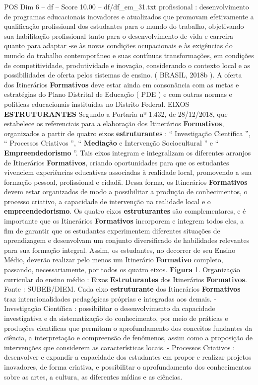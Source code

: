 \begin{textsample}{POS Dim 6 – df – Score 10.00 – df/df\_em\_31.txt}
profissional : desenvolvimento de programas educacionais inovadores e atualizados que promovam efetivamente a qualificação profissional dos estudantes para o mundo do trabalho, objetivando sua habilitação profissional tanto para o desenvolvimento de vida e carreira quanto para adaptar -se às novas condições ocupacionais e às exigências do mundo do trabalho contemporâneo e suas contínuas transformações, em condições de competitividade, produtividade e inovação, considerando o contexto local e as possibilidades de oferta pelos sistemas de ensino. ( BRASIL, 2018b ).
A oferta dos Itinerários \textbf{Formativos} deve estar ainda em consonância com as metas e estratégias do Plano Distrital de Educação ( PDE ) e com outras normas e políticas educacionais instituídas no Distrito Federal.
EIXOS \textbf{ESTRUTURANTES} Segundo a Portaria nº 1.432, de 28/12/2018, que estabelece os referenciais para a elaboração dos Itinerários \textbf{Formativos}, organizados a partir de quatro eixos \textbf{estruturantes} : “ Investigação Científica ”, “ Processos Criativos ”, “ \textbf{Mediação} e Intervenção Sociocultural ” e “ \textbf{Empreendedorismo} ”.
Tais eixos integram e integralizam os diferentes arranjos de Itinerários \textbf{Formativos}, criando oportunidades para que os estudantes vivenciem experiências educativas associadas à realidade local, promovendo a sua formação pessoal, profissional e cidadã.
Dessa forma, os Itinerários \textbf{Formativos} devem estar organizados de modo a possibilitar a produção de conhecimentos, o processo criativo, a capacidade de intervenção na realidade local e o \textbf{empreendedorismo}.
Os quatro eixos \textbf{estruturantes} são complementares, e é importante que os Itinerários \textbf{Formativos} incorporem e integrem todos eles, a fim de garantir que os estudantes experimentem diferentes situações de aprendizagem e desenvolvam um conjunto diversificado de habilidades relevantes para sua formação integral.
Assim, os estudantes, no decorrer de seu Ensino Médio, deverão realizar pelo menos um Itinerário \textbf{Formativo} completo, passando, necessariamente, por todos os quatro eixos. \textbf{Figura} 1.
Organização curricular do ensino médio : Eixos \textbf{Estruturantes} dos Itinerários \textbf{Formativos}.
Fonte : SUBEB/DIEM.
Cada eixo \textbf{estruturante} dos Itinerários \textbf{Formativos} traz intencionalidades pedagógicas próprias e integradas aos demais. - Investigação Científica : possibilitar o desenvolvimento da capacidade investigativa e da sistematização do conhecimento, por meio de práticas e produções científicas que permitam o aprofundamento dos conceitos fundantes da ciência, a interpretação e compreensão de fenômenos, assim como a proposição de intervenções que considerem as características locais. - Processos Criativos : desenvolver e expandir a capacidade dos estudantes em propor e realizar projetos inovadores, de forma criativa, e possibilitar o aprofundamento dos conhecimentos sobre as artes, a cultura, as diferentes mídias e as ciências.

\end{textsample}
